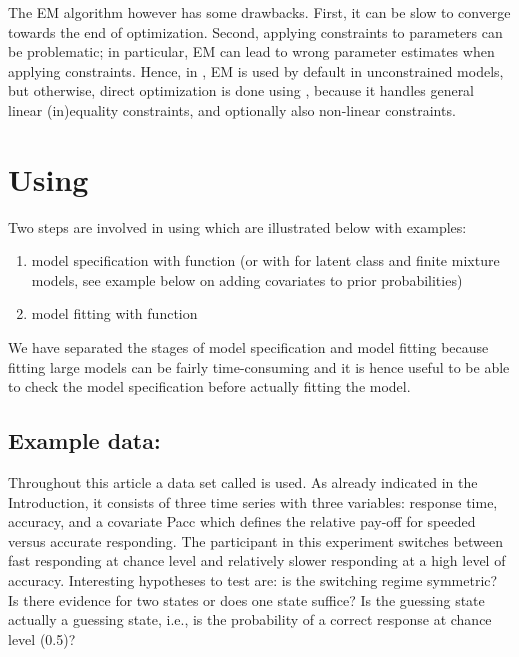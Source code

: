 \documentclass[article]{jss}
\begin{document}
The EM algorithm however has some drawbacks.  First, it can be slow to
converge towards the end of optimization.  Second, applying
constraints to parameters can be problematic; in particular, EM can
lead to wrong parameter estimates when applying constraints.  Hence,
in , EM is used by default in unconstrained models, but
otherwise, direct optimization is done using 
\citep{Tamura2009,Spellucci2002}, because it handles general linear
(in)equality constraints, and optionally also non-linear constraints.



\section[Using depmixS4]{Using }

Two steps are involved in using  which are illustrated
below with examples:
\begin{enumerate}
	\item model specification with function  (or with 
	for latent class and finite mixture models, see example below on adding
	covariates to prior probabilities)
	
	\item  model fitting with function 
\end{enumerate}
We have separated the stages of model specification and model fitting
because fitting large models can be fairly time-consuming and it is
hence useful to be able to check the model specification before
actually fitting the model.

\subsection[Example data: speed]{Example data: }

Throughout this article a data set called  is used.  As
already indicated in the Introduction, it consists of three time
series with three variables: response time, accuracy, and a covariate
Pacc which defines the relative pay-off for speeded versus accurate
responding.  The participant in this experiment switches between fast
responding at chance level and relatively slower responding at a high
level of accuracy.  Interesting hypotheses to test are: is the
switching regime symmetric?  Is there evidence for two states or does
one state suffice?  Is the guessing state actually a guessing state,
i.e., is the probability of a correct response at chance level (0.5)?
\end{document}
